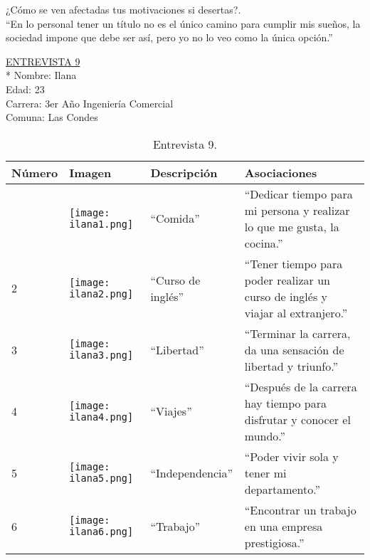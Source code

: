 ¿Cómo se ven afectadas tus motivaciones si desertas?.\\

``En lo personal tener un título no es el único camino para cumplir mis sueños, la sociedad impone que debe ser así, pero yo no lo veo como la única opción.''

\newpage
\underline {ENTREVISTA 9}\\*
Nombre: Ilana\\
Edad: 23\\
Carrera: 3er Año Ingeniería Comercial\\
Comuna: Las Condes \\

\begin{table}[H]
\centering
\begin{tabular}{>{\centering\arraybackslash}m{1cm} >{\centering\arraybackslash}m{2cm} >{\arraybackslash}m{5cm}>{\arraybackslash}m{5cm}}
\hline
Número  & Imagen & Descripción & Asociaciones \\
\hline \hline

1 & \texttt{[image: ilana1.png]} & ``Comida'' & ``Dedicar tiempo para mi persona y realizar lo que me gusta, la cocina.'' \\
\hline

2 & \texttt{[image: ilana2.png]} & ``Curso de inglés'' & ``Tener tiempo para poder realizar un curso de inglés y viajar al extranjero.'' \\
\hline

3 & \texttt{[image: ilana3.png]} & ``Libertad'' & ``Terminar la carrera, da una sensación de libertad y triunfo.'' \\
\hline

4 & \texttt{[image: ilana4.png]} & ``Viajes'' & ``Después de la carrera hay tiempo para disfrutar y conocer el mundo.'' \\
\hline

5 & \texttt{[image: ilana5.png]} & ``Independencia'' & ``Poder vivir sola y tener mi departamento.'' \\
\hline

6 & \texttt{[image: ilana6.png]} & ``Trabajo'' & ``Encontrar un trabajo en una empresa prestigiosa.'' \\
\hline


\end{tabular}
\caption{Entrevista 9.}
\label{tabla:ilana}
\end{table}

